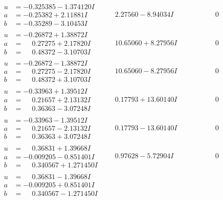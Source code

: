\documentclass[1p]{elsarticle_modified}
\theoremstyle{definition}
\begin{document}
$$\begin{array}{c|c|c}
\begin{aligned}
u &= -0.325385 - 1.374120 I \\
a &= -0.25382 + 2.11881 I \\
b &= -0.35289 - 3.10453 I\end{aligned}
 & \phantom{-}2.27560 - 8.94034 I & \phantom{-0.000000 } 0 \\ \hline\begin{aligned}
u &= -0.26872 + 1.38872 I \\
a &= \phantom{-}0.27275 + 2.17820 I \\
b &= \phantom{-}0.48372 - 3.10703 I\end{aligned}
 & \phantom{-}10.65060 + 8.27956 I & \phantom{-0.000000 } 0 \\ \hline\begin{aligned}
u &= -0.26872 - 1.38872 I \\
a &= \phantom{-}0.27275 - 2.17820 I \\
b &= \phantom{-}0.48372 + 3.10703 I\end{aligned}
 & \phantom{-}10.65060 - 8.27956 I & \phantom{-0.000000 } 0 \\ \hline\begin{aligned}
u &= -0.33963 + 1.39512 I \\
a &= \phantom{-}0.21657 + 2.13132 I \\
b &= \phantom{-}0.36363 - 3.07248 I\end{aligned}
 & \phantom{-}0.17793 + 13.60140 I & \phantom{-0.000000 } 0 \\ \hline\begin{aligned}
u &= -0.33963 - 1.39512 I \\
a &= \phantom{-}0.21657 - 2.13132 I \\
b &= \phantom{-}0.36363 + 3.07248 I\end{aligned}
 & \phantom{-}0.17793 - 13.60140 I & \phantom{-0.000000 } 0 \\ \hline\begin{aligned}
u &= \phantom{-}0.36831 + 1.39668 I \\
a &= -0.009205 - 0.851401 I \\
b &= \phantom{-}0.340567 + 1.271450 I\end{aligned}
 & \phantom{-}0.97628 - 5.72904 I & \phantom{-0.000000 } 0 \\ \hline\begin{aligned}
u &= \phantom{-}0.36831 - 1.39668 I \\
a &= -0.009205 + 0.851401 I \\
b &= \phantom{-}0.340567 - 1.271450 I\end{aligned}

\end{array}$$
\end{document}
